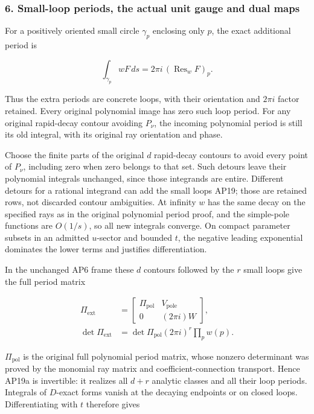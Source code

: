 \documentclass{article}
\begin{document}
\subsubsection{6. Small-loop periods, the actual unit gauge and dual maps}\label{endpoint-analytic_pole--small-loop-periods-the-actual-unit-gauge-and-dual-maps}

For a positively oriented small circle \(\gamma_p\) enclosing only \(p\), the exact additional period is

\[
\int_{\gamma_p}wF\,ds
=2\pi i\,(\operatorname{Res}_w F)_p.
\tag{AP19}
\]

Thus the extra periods are concrete loops, with their orientation and \(2\pi i\) factor retained. Every original polynomial image has zero such loop period. For any original rapid-decay contour avoiding \(P_\nu\), the incoming polynomial period is still its old integral, with its original ray orientation and phase.

Choose the finite parts of the original \(d\) rapid-decay contours to avoid every point of \(P_\nu\), including zero when zero belongs to that set. Such detours leave their polynomial integrals unchanged, since those integrands are entire. Different detours for a rational integrand can add the small loops AP19; those are retained rows, not discarded contour ambiguities. At infinity \(w\) has the same decay on the specified rays as in the original polynomial period proof, and the simple-pole functions are \(O(1/s)\), so all new integrals converge. On compact parameter subsets in an admitted \(u\)-sector and bounded \(t\), the negative leading exponential dominates the lower terms and justifies differentiation.

In the unchanged AP6 frame these \(d\) contours followed by the \(r\) small loops give the full period matrix

\[
\begin{aligned}
\Pi_{\mathrm{ext}}&=\begin{bmatrix}
\Pi_{\mathrm{pol}}&V_{\mathrm{pole}}\\0&(2\pi i)W
\end{bmatrix},\\
\det\Pi_{\mathrm{ext}}&=\det\Pi_{\mathrm{pol}}(2\pi i)^r\prod_p w(p).
\end{aligned}
\tag{AP19a}
\]

\(\Pi_{\mathrm{pol}}\) is the original full polynomial period matrix, whose nonzero determinant was proved by the monomial ray matrix and coefficient-connection transport. Hence AP19a is invertible: it realizes all \(d+r\) analytic classes and all their loop periods. Integrals of \(D\)-exact forms vanish at the decaying endpoints or on closed loops. Differentiating with \(t\) therefore gives
\end{document}
